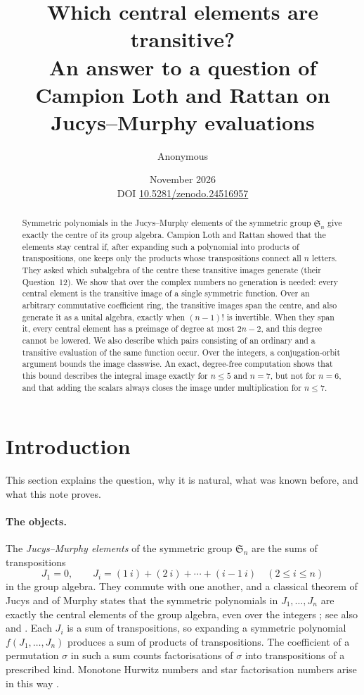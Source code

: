 \documentclass[11pt,a4paper]{article}
\title{Which central elements are transitive?\\[4pt]
\large An answer to a question of Campion Loth and Rattan on Jucys--Murphy evaluations}
\author{Anonymous}
\date{November 2026\\[2pt]\small DOI \href{https://doi.org/10.5281/zenodo.24516957}{10.5281/zenodo.24516957}}
\theoremstyle{definition}
\newcommand{\Sn}{\mathfrak S}
\begin{document}
\maketitle

\begin{abstract}
Symmetric polynomials in the Jucys--Murphy elements of the symmetric group $\Sn_n$ give exactly the centre of its group algebra. Campion Loth and Rattan showed that the elements stay central if, after expanding such a polynomial into products of transpositions, one keeps only the products whose transpositions connect all $n$ letters. They asked which subalgebra of the centre these transitive images generate (their Question~12). We show that over the complex numbers no generation is needed: every central element is the transitive image of a single symmetric function. Over an arbitrary commutative coefficient ring, the transitive images span the centre, and also generate it as a unital algebra, exactly when $(n-1)!$ is invertible. When they span it, every central element has a preimage of degree at most $2n-2$, and this degree cannot be lowered. We also describe which pairs consisting of an ordinary and a transitive evaluation of the same function occur. Over the integers, a conjugation-orbit argument bounds the image classwise. An exact, degree-free computation shows that this bound describes the integral image exactly for $n\le 5$ and $n=7$, but not for $n=6$, and that adding the scalars always closes the image under multiplication for $n\le7$.
\end{abstract}

\section{Introduction}\label{sec:intro}
This section explains the question, why it is natural, what was known before, and what this note proves.

\paragraph{The objects.} The \emph{Jucys--Murphy elements} of the symmetric group $\Sn_n$ are the sums of transpositions
\[
 J_1=0,\qquad J_i=(1\ i)+(2\ i)+\cdots+(i-1\ i)\quad(2\le i\le n)
\]
in the group algebra. They commute with one another, and a classical theorem of Jucys and of Murphy states that the symmetric polynomials in $J_1,\ldots,J_n$ are exactly the central elements of the group algebra, even over the integers \cite{jucys,murphy}; see also \cite[Theorem~2]{clr} and \cite[Introduction]{murray}. Each $J_i$ is a sum of transpositions, so expanding a symmetric polynomial $f(J_1,\ldots,J_n)$ produces a sum of products of transpositions. The coefficient of a permutation $\sigma$ in such a sum counts factorisations of $\sigma$ into transpositions of a prescribed kind. Monotone Hurwitz numbers and star factorisation numbers arise in this way \cite{clr,gj}.
\end{document}
